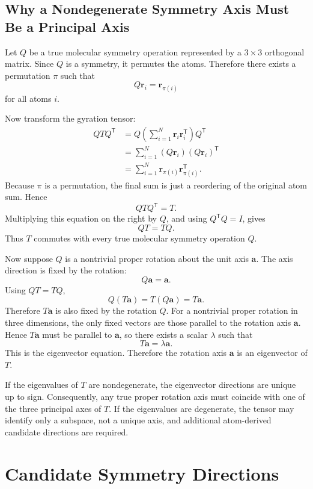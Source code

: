 \documentclass[11pt]{article}
\newcommand{\T}{\mathsf{T}}
\begin{document}
\subsection{Why a Nondegenerate Symmetry Axis Must Be a Principal Axis}

Let \(Q\) be a true molecular symmetry operation represented by a \(3\times 3\)
orthogonal matrix.  Since \(Q\) is a symmetry, it permutes the atoms.  Therefore
there exists a permutation \(\pi\) such that
\[
    Q\mathbf r_i = \mathbf r_{\pi(i)}
\]
for all atoms \(i\).

Now transform the gyration tensor:
\[
\begin{aligned}
    QTQ^{\T}
    &=
    Q
    \left(\sum_{i=1}^{N}\mathbf r_i\mathbf r_i^{\T}\right)
    Q^{\T}\\
    &=
    \sum_{i=1}^{N}
    (Q\mathbf r_i)(Q\mathbf r_i)^{\T}\\
    &=
    \sum_{i=1}^{N}
    \mathbf r_{\pi(i)}\mathbf r_{\pi(i)}^{\T}.
\end{aligned}
\]
Because \(\pi\) is a permutation, the final sum is just a reordering of the
original atom sum.  Hence
\[
    QTQ^{\T} = T.
\]
Multiplying this equation on the right by \(Q\), and using \(Q^{\T}Q=I\), gives
\[
    QT = TQ.
\]
Thus \(T\) commutes with every true molecular symmetry operation \(Q\).

Now suppose \(Q\) is a nontrivial proper rotation about the unit axis
\(\mathbf a\).  The axis direction is fixed by the rotation:
\[
    Q\mathbf a = \mathbf a.
\]
Using \(QT=TQ\),
\[
    Q(T\mathbf a)
    =
    T(Q\mathbf a)
    =
    T\mathbf a.
\]
Therefore \(T\mathbf a\) is also fixed by the rotation \(Q\).  For a nontrivial
proper rotation in three dimensions, the only fixed vectors are those parallel
to the rotation axis \(\mathbf a\).  Hence \(T\mathbf a\) must be parallel to
\(\mathbf a\), so there exists a scalar \(\lambda\) such that
\[
    T\mathbf a = \lambda\mathbf a.
\]
This is the eigenvector equation.  Therefore the rotation axis
\(\mathbf a\) is an eigenvector of \(T\).

If the eigenvalues of \(T\) are nondegenerate, the eigenvector directions are
unique up to sign.  Consequently, any true proper rotation axis must coincide
with one of the three principal axes of \(T\).  If the eigenvalues are
degenerate, the tensor may identify only a subspace, not a unique axis, and
additional atom-derived candidate directions are required.

\section{Candidate Symmetry Directions}
\end{document}

